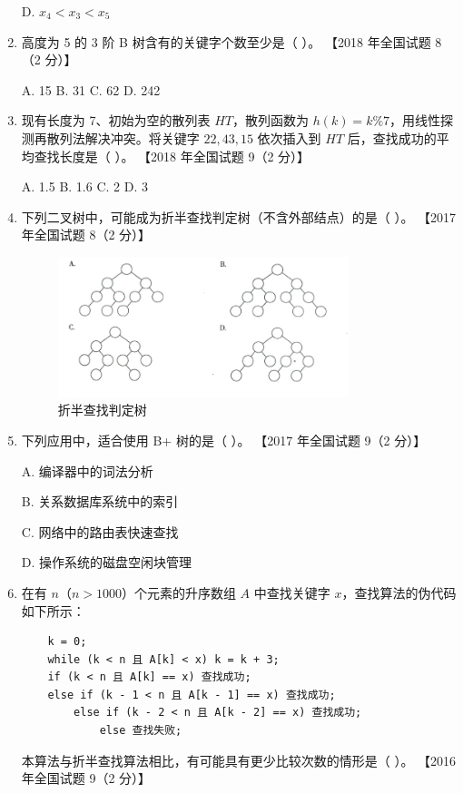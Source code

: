 \documentclass[lang=cn,newtx,10pt,scheme=chinese]{../../elegantbook}
\begin{document}
\begin{enumerate}
    D. $x_4 < x_3 < x_5$  

    \item 高度为 5 的 3 阶 B 树含有的关键字个数至少是（ ）。  
    【2018 年全国试题 8（2 分）】  

    A. 15 \quad B. 31 \quad C. 62 \quad D. 242  

    \item 现有长度为 7、初始为空的散列表 $HT$，散列函数为 $h(k) = k \% 7$，用线性探测再散列法解决冲突。将关键字 $22, 43, 15$ 依次插入到 $HT$ 后，查找成功的平均查找长度是（ ）。  
    【2018 年全国试题 9（2 分）】  

    A. 1.5 \quad B. 1.6 \quad C. 2 \quad D. 3  

    \item 下列二叉树中，可能成为折半查找判定树（不含外部结点）的是（ ）。  
    【2017 年全国试题 8（2 分）】  

    \begin{figure}[h!]
        \centering
        \includegraphics[width=0.8\textwidth]{../../figure/exercisePicPDF/chapter9/9-6.pdf}
        \caption{折半查找判定树}
    \end{figure}

    \item 下列应用中，适合使用 B+ 树的是（ ）。  
    【2017 年全国试题 9（2 分）】 

    A. 编译器中的词法分析  

    B. 关系数据库系统中的索引  

    C. 网络中的路由表快速查找  

    D. 操作系统的磁盘空闲块管理  

    \item 在有 $n$（$n > 1000$）个元素的升序数组 $A$ 中查找关键字 $x$，查找算法的伪代码如下所示：  
    \begin{verbatim}
    k = 0;
    while (k < n 且 A[k] < x) k = k + 3;
    if (k < n 且 A[k] == x) 查找成功;
    else if (k - 1 < n 且 A[k - 1] == x) 查找成功;
        else if (k - 2 < n 且 A[k - 2] == x) 查找成功;
            else 查找失败;
    \end{verbatim}
    本算法与折半查找算法相比，有可能具有更少比较次数的情形是（ ）。  
    【2016 年全国试题 9（2 分）】  


\end{enumerate}
\end{document}
